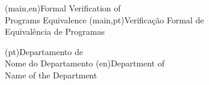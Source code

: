 
%


\nttitle(main,en){Formal Verification of\\ Programs Equivalence}%
\nttitle(main,pt){Verificação Formal de\\ Equivalência de Programas}%



\ntdepartment*(pt){Departamento de\\Nome do Departamento}
\ntdepartment*(en){Department of\\Name of the Department}

